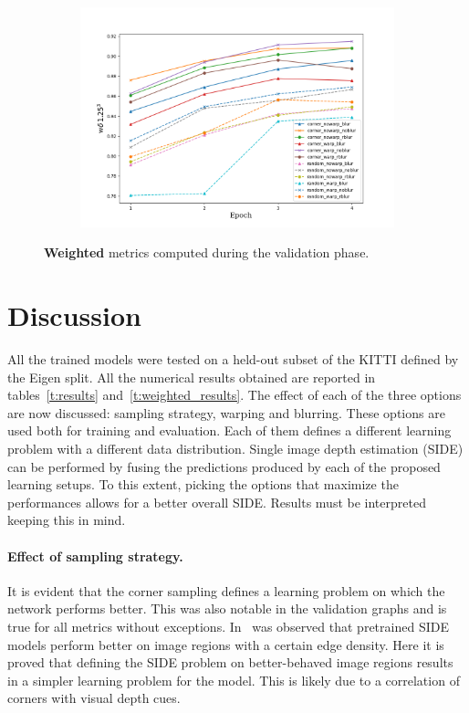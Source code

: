 \begin{figure}
\begin{adjustwidth}{-0.2\textwidth}{-0.2\textwidth}
        \begin{subfigure}{0.6\textwidth}
            \includegraphics[width=\textwidth]{figs/wa3}
        \end{subfigure}
    \end{adjustwidth}
    \caption{
        \textbf{Weighted} metrics computed during the validation phase.
        \label{fig:Wvalidation}
    }
\end{figure}

\section{Discussion}
\label{sec:discussion}

All the trained models were tested on a held-out subset of the KITTI defined by the Eigen split.
All the numerical results obtained are reported in tables~\ref{t:results} and~\ref{t:weighted_results}.
The effect of each of the three options are now discussed: sampling strategy, warping and blurring.
These options are used both for training and evaluation.
Each of them defines a different learning problem with a different data distribution.
Single image depth estimation (SIDE) can be performed by fusing the predictions produced by each of the proposed learning setups.
To this extent, picking the options that maximize the performances allows for a better overall SIDE.
Results must be interpreted keeping this in mind.

\paragraph{Effect of sampling strategy.}
It is evident that the corner sampling defines a learning problem on which the network performs better.
This was also notable in the validation graphs and is true for all metrics without exceptions.
In~\cite{BoostingDepth} was observed that pretrained SIDE models perform better on image regions with a certain edge density.
Here it is proved that defining the SIDE problem on better-behaved image regions results in a simpler learning problem for the model.
This is likely due to a correlation of corners with visual depth cues.


